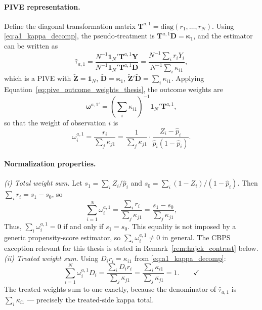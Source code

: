 \documentclass[12pt, a4paper, oneside]{article}
\theoremstyle{plain}
\theoremstyle{definition}
\begin{document}
\paragraph{PIVE representation.}
Define the diagonal transformation matrix
$\mathbf{T}^{a,1} = \mathrm{diag}(r_1, \ldots, r_N)$.
Using \eqref{eq:a1_kappa_decomp}, the pseudo-treatment is
$\mathbf{T}^{a,1}\mathbf{D} = \boldsymbol{\kappa}_1$,
and the estimator can be written as
\begin{equation}
  \hat\tau_{a,1}
  = \frac{N^{-1}\mathbf{1}_N'\mathbf{T}^{a,1}\mathbf{Y}}
         {N^{-1}\mathbf{1}_N'\mathbf{T}^{a,1}\mathbf{D}}
  = \frac{N^{-1}\sum_i r_i Y_i}{N^{-1}\sum_i \kappa_{i1}},
  \label{eq:a1_wald}
\end{equation}
which is a PIVE with $\widetilde{\mathbf{Z}} = \mathbf{1}_N$,
$\widetilde{\mathbf{D}} = \boldsymbol{\kappa}_1$,
$\widetilde{\mathbf{Z}}'\widetilde{\mathbf{D}} = \sum_i\kappa_{i1}$.
Applying Equation~\eqref{eq:pive_outcome_weights_thesis}, the outcome weights are
\begin{equation}
  \boldsymbol{\omega}^{a,1\prime}
  = \left(\sum_i\kappa_{i1}\right)^{-1} \mathbf{1}_N' \mathbf{T}^{a,1},
  \label{eq:a1_omega_vec}
\end{equation}
so that the weight of observation $i$ is
\begin{equation}
  \boxed{
    \omega_i^{a,1} = \frac{r_i}{\sum_j \kappa_{j1}}
    = \frac{1}{\sum_j \kappa_{j1}}
      \cdot\frac{Z_i - \hat{p}_i}{\hat{p}_i(1-\hat{p}_i)}.
  }
  \label{eq:a1_omega_scalar}
\end{equation}

\paragraph{Normalization properties.}

\noindent\textit{(i) Total weight sum.}
Let $s_1 = \sum_i Z_i/\hat{p}_i$ and $s_0 = \sum_i(1-Z_i)/(1-\hat{p}_i)$.
Then $\sum_i r_i = s_1 - s_0$, so
\begin{equation}
  \sum_{i=1}^N \omega_i^{a,1}
  = \frac{\sum_i r_i}{\sum_j\kappa_{j1}}
  = \frac{s_1 - s_0}{\sum_j\kappa_{j1}},
  \label{eq:a1_sum}
\end{equation}
Thus, $\sum_i\omega_i^{a,1}=0$ if and only if $s_1=s_0$. This equality is
not imposed by a generic propensity-score estimator, so
$\sum_i\omega_i^{a,1}\neq0$ in general. The CBPS exception relevant for this
thesis is stated in Remark~\ref{rem:hajek_contrast} below.
\noindent\textit{(ii) Treated weight sum.}
Using $D_i r_i = \kappa_{i1}$ from \eqref{eq:a1_kappa_decomp}:
\begin{equation}
  \sum_{i=1}^N \omega_i^{a,1} D_i
  = \frac{\sum_i D_i r_i}{\sum_j\kappa_{j1}}
  = \frac{\sum_i \kappa_{i1}}{\sum_j\kappa_{j1}}
  = 1. \qquad\checkmark
  \label{eq:a1_treated}
\end{equation}
The treated weights sum to one exactly, because the denominator of $\hat\tau_{a,1}$
is $\sum_i\kappa_{i1}$ — precisely the treated-side kappa total.
\end{document}
